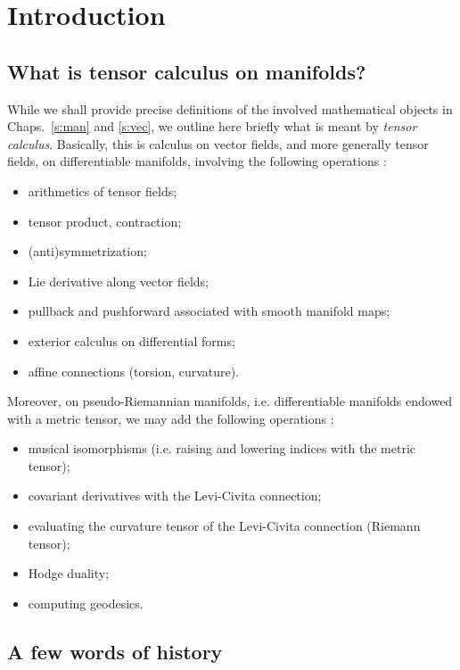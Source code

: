 \chapter{Introduction} \label{s:int}

\minitoc

\section{What is tensor calculus on manifolds?}

While we shall provide precise definitions of the involved mathematical
objects in Chaps.~\ref{s:man} and \ref{s:vec},
we outline here briefly what is meant by
\emph{tensor calculus}. Basically, this is calculus on vector fields,
and more generally tensor fields, on differentiable manifolds, involving the following operations \cite{Lee13}:
\begin{itemize}
\item arithmetics of tensor fields;
\item tensor product, contraction;
\item (anti)symmetrization;
\item Lie derivative along vector fields;
\item pullback and pushforward associated with smooth manifold maps;
\item exterior calculus on differential forms;
\item affine connections (torsion, curvature).
\end{itemize}
Moreover, on pseudo-Riemannian manifolds, i.e. differentiable manifolds endowed
with a metric tensor, we may add the following
operations \cite{Lee97,ONeil83}:
\begin{itemize}
\item musical isomorphisms (i.e. raising and lowering indices with the metric tensor);
\item covariant derivatives with the Levi-Civita connection;
\item evaluating the curvature tensor of the Levi-Civita connection (Riemann tensor);
\item Hodge duality;
\item computing geodesics.
\end{itemize}


\section{A few words of history}

